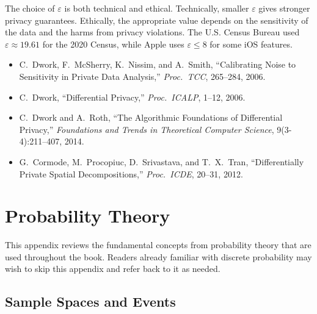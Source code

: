 \documentclass[twoside,12pt]{book}
\theoremstyle{plain}
\theoremstyle{definition}
\theoremstyle{remark}
\begin{document}
The choice of $\varepsilon$ is both technical and ethical. Technically, smaller $\varepsilon$ gives stronger privacy guarantees. Ethically, the appropriate value depends on the sensitivity of the data and the harms from privacy violations. The U.S. Census Bureau used $\varepsilon \approx 19.61$ for the 2020 Census, while Apple uses $\varepsilon \leq 8$ for some iOS features.

\begin{itemize}[nosep]
  \item C.~Dwork, F.~McSherry, K.~Nissim, and A.~Smith, ``Calibrating Noise to Sensitivity in Private Data Analysis,'' \textit{Proc.~TCC}, 265--284, 2006.
  \item C.~Dwork, ``Differential Privacy,'' \textit{Proc.~ICALP}, 1--12, 2006.
  \item C.~Dwork and A.~Roth, ``The Algorithmic Foundations of Differential Privacy,'' \textit{Foundations and Trends in Theoretical Computer Science}, 9(3-4):211--407, 2014.
  \item G.~Cormode, M.~Procopiuc, D.~Srivastava, and T.~X.~Tran, ``Differentially Private Spatial Decompositions,'' \textit{Proc.~ICDE}, 20--31, 2012.
\end{itemize}

\appendix

\chapter{Probability Theory}
\label{app:probability}

This appendix reviews the fundamental concepts from probability theory that
are used throughout the book. Readers already familiar with discrete
probability may wish to skip this appendix and refer back to it as needed.

\section{Sample Spaces and Events}
\label{app:sec:sample-spaces}
\end{document}
